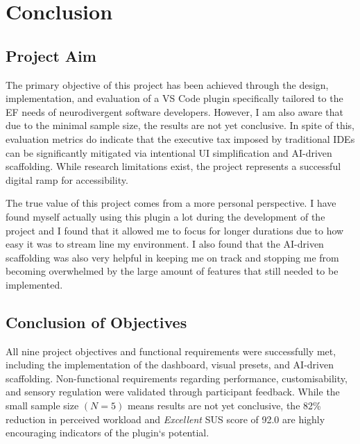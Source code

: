 \section{Conclusion}
\subsection{Project Aim}
The primary objective of this project has been achieved through the design, implementation, and evaluation of a VS Code plugin specifically 
tailored to the \gls{EF} needs of \gls{neurodivergent} software developers. However, I am also aware that due to the minimal sample size, the results are not yet conclusive.
In spite of this, evaluation metrics do indicate that the executive tax imposed by traditional \glspl{IDE} can be significantly mitigated via intentional UI simplification and \gls{AI}-driven \gls{scaffolding}. While research 
limitations exist, the project represents a successful digital ramp for accessibility. 

The true value of this project comes from a more personal perspective. I have found myself actually using this plugin a lot during the development of the project and I found that it allowed me to focus for longer durations due 
to how easy it was to stream line my environment. I also found that the \gls{AI}-driven \gls{scaffolding} was also very helpful 
in keeping me on track and stopping me from becoming overwhelmed by the large amount of features that still needed to be implemented.
 
\subsection{Conclusion of Objectives}
All nine project objectives and functional requirements were successfully met, including the implementation of the dashboard, visual presets, 
and \gls{AI}-driven \gls{scaffolding}. Non-functional requirements regarding performance, customisability, and sensory regulation were validated through 
participant feedback. While the small sample size $(N=5)$ means results are not yet conclusive, the 82\% 
reduction in perceived workload and \textit{Excellent} \gls{SUS} score of 92.0 are highly encouraging indicators of the plugin`s potential.

